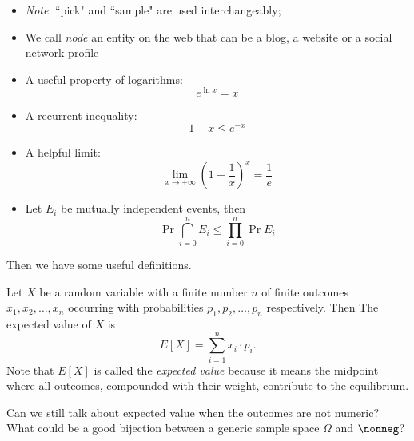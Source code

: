     \begin{itemize}
        \item \textit{Note}: ``pick" and ``sample" are used interchangeably;
        \item We call \emph{node} an entity on the web that can be a blog, a website or a social network profile
        \item A useful property of logarithms:
            \begin{equation}\label{eq:log-prop}
                e^{\ln x} = x
            \end{equation}
        \item A recurrent inequality:
            \begin{equation}\label{eq:e-x}
                1-x \leq e^{-x}
            \end{equation}
        \item A helpful limit:
            \begin{equation}\label{eq:limit-1/e}
                \lim_{x \to +\infty} \left(1 - \frac{1}{x}\right)^x = \frac{1}{e}
            \end{equation}
        \item Let $E_i$ be mutually independent events, then
            \begin{equation}\label{eq:prob}
                \Pr{\bigcap_{i=0}^n E_i} \leq \prod_{i=0}^{n}\Pr{E_i}
            \end{equation}
    \end{itemize}
    
    Then we have some useful definitions.
    
    \begin{defn}\label{def:expected-value}
        Let $X$ be a random variable with a finite number $n$ of finite outcomes $x_{1},x_{2},\ldots,x_{n}$ occurring with probabilities $p_{1},p_{2},\ldots,p_{n}$ respectively. Then The expected value of $X$ is
        \begin{equation}
            E[X] = \sum_{i=1}^{n} x_i \cdot p_i.
        \end{equation}
        Note that $E[X]$ is called the \textit{expected value} because it means the midpoint where all outcomes, compounded with their weight, contribute to the equilibrium.
        
        \begin{qst}
            Can we still talk about expected value when the outcomes are not numeric? What could be a good bijection between a generic sample space $\Omega$ and $\nonneg$?
        \end{qst}
    \end{defn}
    
